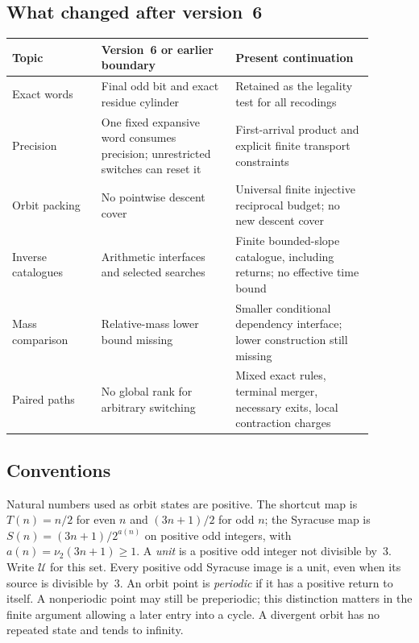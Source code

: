 \documentclass[11pt,a4paper]{article}
\newcommand{\U}{\mathcal U}
\theoremstyle{definition}
\begin{document}
\subsection{What changed after version~6}
\begin{center}\small
\begin{tabular}{>{\raggedright\arraybackslash}p{0.22\linewidth}>{\raggedright\arraybackslash}p{0.33\linewidth}>{\raggedright\arraybackslash}p{0.34\linewidth}}
\toprule
Topic & Version~6 or earlier boundary & Present continuation\\
\midrule
Exact words & Final odd bit and exact residue cylinder & Retained as the legality test for all recodings\\
Precision & One fixed expansive word consumes precision; unrestricted switches can reset it & First-arrival product and explicit finite transport constraints\\
Orbit packing & No pointwise descent cover & Universal finite injective reciprocal budget; no new descent cover\\
Inverse catalogues & Arithmetic interfaces and selected searches & Finite bounded-slope catalogue, including returns; no effective time bound\\
Mass comparison & Relative-mass lower bound missing & Smaller conditional dependency interface; lower construction still missing\\
Paired paths & No global rank for arbitrary switching & Mixed exact rules, terminal merger, necessary exits, local contraction charges\\
\bottomrule
\end{tabular}
\end{center}

\subsection{Conventions}
Natural numbers used as orbit states are positive. The shortcut map is
$T(n)=n/2$ for even $n$ and $(3n+1)/2$ for odd $n$; the Syracuse map
is $S(n)=(3n+1)/2^{a(n)}$ on positive odd integers, with
$a(n)=\nu_2(3n+1)\ge1$. A \emph{unit} is a positive odd integer
not divisible by~3. Write $\U$ for this set. Every positive odd
Syracuse image is a unit, even when its source is divisible by~3.
An orbit point is \emph{periodic} if it has a positive return to itself.
A nonperiodic point may still be preperiodic; this distinction matters
in the finite argument allowing a later entry into a cycle.
A divergent orbit has no repeated state and tends to infinity.
\end{document}
